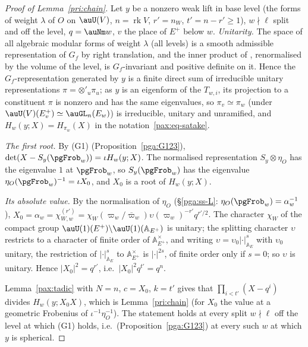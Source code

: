 \documentclass[10pt]{amsart}
\theoremstyle{definition}
\theoremstyle{remark}
\begin{document}
\begin{proof}[Proof of Lemma~\ref{pri:chain}]
Let $y$ be a nonzero weak lift in base level (the forms of weight $\lambda$ of $O$ on $\auU(V)$, $n=
\operatorname{rk}V$, $r'=n_W$, $t'=n-r'\ge1$), $w\nmid\ell$ split and off the level, $q=\auNm w$,
$v$ the place of $E^+$ below $w$. \emph{Unitarity.} The space of all algebraic modular forms of weight
$\lambda$ (all levels) is a smooth admissible representation of $G_f$ by right translation, and the
inner product of {\cite[\S14.3]{P46}}, renormalised by the volume of the level, is $G_f$-invariant and
positive definite on it. Hence the $G_f$-representation generated by $y$ is a finite direct sum of
irreducible unitary representations $\pi=\otimes'_u\pi_u$; as $y$ is an eigenform of the $T_{w,i}$,
its projection to a constituent $\pi$ is nonzero and has the same eigenvalues, so $\pi_v\simeq\pi_w$
(under $\auU(V)(E^+_v)\simeq\auGL_n(E_w)$) is irreducible, unitary and unramified, and $H_w(y;X)=
H_{\pi_w}(X)$ in the notation~\eqref{pax:eq-satake}.

\emph{The first root.} By (G1) (Proposition~\ref{pga:G123}), $\det(X-S_y(\pgFrob_w))=\iota H_w(y;X)$.
The normalised representation $S_y\otimes\eta_O$ has the eigenvalue $1$ at $\pgFrob_w$, so $S_y(
\pgFrob_w)$ has the eigenvalue $\eta_O(\pgFrob_w)^{-1}=\iota X_0$, and $X_0$ is a root of $H_w(y;X)$.

\emph{Its absolute value.} By the normalisation of $\eta_O$ (\S\ref{pga:ss-L}: $\eta_O(\pgFrob_w)=
\alpha_w^{-1}$), $X_0=\alpha_w=\chi_{W,w}^{(r')}=\chi_W(\varpi_w/\overline\varpi_w)\upsilon(\varpi_w
)^{-r'}q^{r'/2}$. The character $\chi_W$ of the compact group $\auU(1)(E^+)\backslash\auU(1)(\mathbb A
_{E^+})$ is unitary; the splitting character $\upsilon$ restricts to a character of finite order of
$\mathbb A_{E^+}^\times$, and writing $\upsilon=\upsilon_0|\cdot|_{\mathbb A_E}^s$ with $\upsilon_0$
unitary, the restriction of $|\cdot|^s_{\mathbb A_E}$ to $\mathbb A_{E^+}^\times$ is $|\cdot|^{2s}$,
of finite order only if $s=0$; so $\upsilon$ is unitary. Hence $|X_0|^2=q^{r'}$, i.e.\
$|X_0|^2q^{t'}=q^n$.

Lemma~\ref{pax:tadic} with $N=n$, $c=X_0$, $k=t'$ gives that $\prod_{i<t'}(X-q^i)$ divides $H_w(y;
X_0X)$, which is Lemma~\ref{pri:chain} (for $X_0$ the value at a geometric Frobenius of $\iota^{-1}
\eta_O^{-1}$). The statement holds at every split $w\nmid\ell$ off the level at which (G1) holds,
i.e.\ (Proposition~\ref{pga:G123}) at every such $w$ at which $y$ is spherical.
\end{proof}
\end{document}
